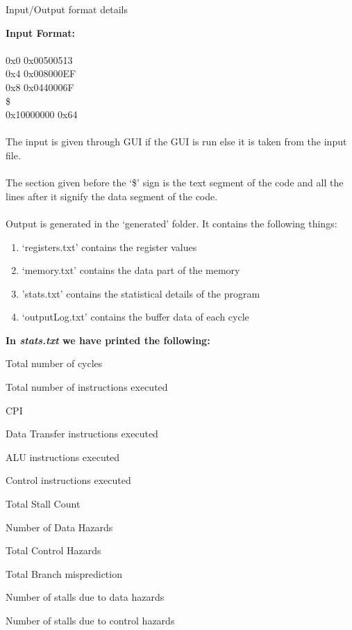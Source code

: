 \documentclass{article}
\begin{document}
\newpage
\begin{centering}
\begin{Huge}
\textsf{Input/Output format details}\\
\end{Huge}
\vspace{0.6cm}
\end{centering}
\noindent
\LARGE
{\bf Input Format:}\\\\
0x0 0x00500513\\
0x4 0x008000EF\\
0x8 0x0440006F\\
\$\\
0x10000000 0x64\\\\
The input is given through GUI if the GUI is run else it is taken from the input file.\\\\
The section given before the `\$' sign is the text segment of the code and all the lines after it signify the data segment of the code.\\\\
Output is generated in the `generated' folder. It contains the following things:  \\
\begin{enumerate}
    \item `registers.txt' contains the register values
    \item `memory.txt' contains the data part of the memory
    \item 'stats.txt' contains the statistical details of the program
    \item `outputLog.txt' contains the buffer data of each cycle
\end{enumerate}


\newpage
\Large
\textbf{In \textsl{stats.txt} we have printed the following:}

\begin{enumerate}
\begin{LARGE}
\item \textsf{Total number of cycles}
\item \textsf{Total number of instructions executed}
\item \textsf{CPI}
\item \textsf{Data Transfer instructions executed}
\item \textsf{ALU instructions executed}
\item \textsf{Control instructions executed}
\item \textsf{Total Stall Count}
\item \textsf{Number of Data Hazards}
\item \textsf{Total Control Hazards}
\item \textsf{Total Branch misprediction}
\item \textsf{Number of stalls due to data hazards}
\item \textsf{Number of stalls due to control hazards}
\end{LARGE}
\end{enumerate}
\end{document}
